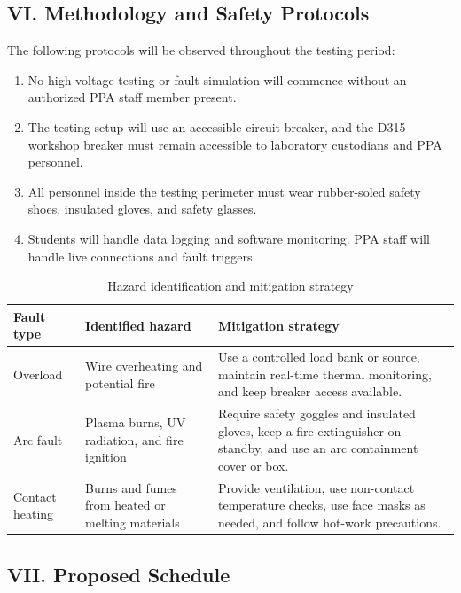 \subsection*{VI. Methodology and Safety Protocols}

The following protocols will be observed throughout the testing period:
\begin{enumerate}
\item No high-voltage testing or fault simulation will commence without an
authorized PPA staff member present.
\item The testing setup will use an accessible circuit breaker, and the D315
workshop breaker must remain accessible to laboratory custodians and PPA
personnel.
\item All personnel inside the testing perimeter must wear rubber-soled safety
shoes, insulated gloves, and safety glasses.
\item Students will handle data logging and software monitoring. PPA staff will
handle live connections and fault triggers.
\end{enumerate}

\begin{table}[H]
  \centering
  \caption{Hazard identification and mitigation strategy}
  \label{tab:app-g-hazard-mitigation}
  \begin{tabular}{p{}p{}p{}}
    \toprule
    \textbf{Fault type} & \textbf{Identified hazard} & \textbf{Mitigation strategy} \\
    \midrule
    Overload & Wire overheating and potential fire & Use a controlled load bank or source, maintain real-time thermal monitoring, and keep breaker access available. \\
    Arc fault & Plasma burns, UV radiation, and fire ignition & Require safety goggles and insulated gloves, keep a fire extinguisher on standby, and use an arc containment cover or box. \\
    Contact heating & Burns and fumes from heated or melting materials & Provide ventilation, use non-contact temperature checks, use face masks as needed, and follow hot-work precautions. \\
    \bottomrule
  \end{tabular}
\end{table}

\subsection*{VII. Proposed Schedule}

